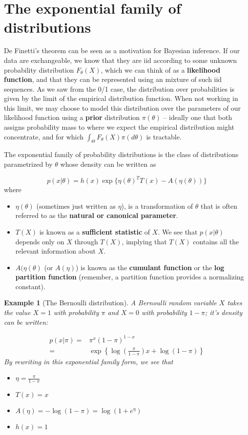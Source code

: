 \documentclass[twoside]{article}
\newcounter{lecnum}
\newtheorem{example}{Example}[lecnum]
\begin{document}
  

\section{The exponential family of distributions}

De Finetti's theorem can be seen as a motivation for Bayesian inference. If our data are exchangeable, we know that they are iid according to some unknown probability distribution $F_\theta(X)$, which we can think of as a \textbf{likelihood function}, and that they can be represented using an mixture of such iid sequences. As we saw from the 0/1 case, the distribution over probabilities is given by the limit of the empirical distribution function. When not working in this limit, we may choose to model this distribution over the parameters of our likelihood function using a \textbf{prior} distribution $\pi(\theta)$ -- ideally one that both assigns probability mass to where we expect the empirical distribution might concentrate, and for which $\int_\Theta F_\theta(X) \pi(d\theta)$ is tractable.

The exponential family of probability distributions is the class of distributions parametrized by $\theta$ whose density can be written as

$$p(x|\theta) = h(x)\exp\{\eta(\theta)^TT(x) - A(\eta(\theta))\}$$
where 
\begin{itemize}
\item $\eta(\theta)$ (sometimes just written as $\eta$), is a transformation of $\theta$ that is often referred to as the \textbf{natural or canonical parameter}.
\item $T(X)$ is known as a \textbf{sufficient statistic} of $X$. We see that $p(x|\theta)$ depends only on $X$ through $T(X)$, implying that $T(X)$ contains all the relevant information about $X$.
\item $A(\eta(\theta)$ (or $A(\eta)$) is known as the \textbf{cumulant function} or the \textbf{log partition function} (remember, a partition function provides a normalizing constant).
\end{itemize}

\begin{example}[The Bernoulli distribution]
  A Bernoulli random variable $X$ takes the value $X=1$ with probability $\pi$ and $X=0$ with probability $1-\pi$; it's density can be written:

  $$\begin{aligned}
    p(x|\pi) =& \pi^x(1-\pi)^{1-x}\\
    =& \exp\left\{\log\left(\frac{\pi}{1-\pi}\right)x + \log(1-\pi)\right\}\end{aligned}$$
    By rewriting in this exponential family form, we see that
    \begin{itemize}
    \item $\eta = \frac{\pi}{1-\pi}$
    \item $T(x) = x$
    \item $A(\eta) = -\log(1-\pi) = \log(1+e^{\eta})$
    \item $h(x)=1$
    \end{itemize}
\end{example}
\end{document}
